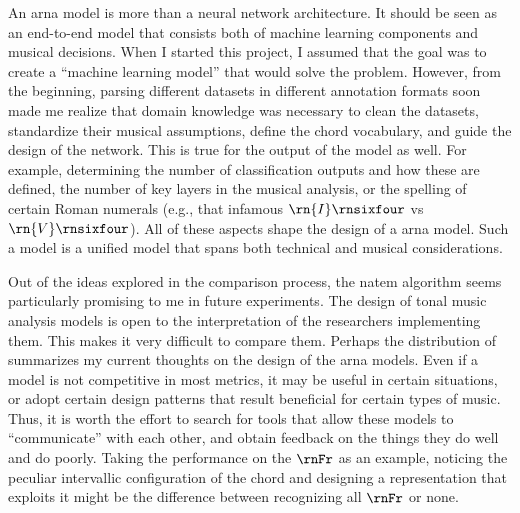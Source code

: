 
An \gls{arna} model is more than a neural network
architecture. It should be seen as an end-to-end model that
consists both of machine learning components and musical
decisions. When I started this project, I assumed that the
goal was to create a ``machine learning model'' that would
solve the problem. However, from the beginning, parsing
different datasets in different annotation formats soon made
me realize that domain knowledge was necessary to clean the
datasets, standardize their musical assumptions, define the
chord vocabulary, and guide the design of the network. This
is true for the output of the model as well. For example,
determining the number of classification outputs and how
these are defined, the number of key layers in the musical
analysis, or the spelling of certain Roman numerals (e.g.,
that infamous $\rn{I}\rnsixfour$ vs $\rn{V}\rnsixfour$). All
of these aspects shape the design of a \gls{arna} model.
Such a model is a unified model that spans both technical
and musical considerations.

Out of the ideas explored in the comparison process, the
\gls{natem} algorithm seems particularly promising to me in
future experiments. The design of tonal music analysis
models is open to the interpretation of the researchers
implementing them. This makes it very difficult to compare
them. Perhaps the distribution of 
summarizes my current thoughts on the design of the
\gls{arna} models. Even if a model is not competitive in
most metrics, it may be useful in certain situations, or
adopt certain design patterns that result beneficial for
certain types of music. Thus, it is worth the effort to
search for tools that allow these models to ``communicate''
with each other, and obtain feedback on the things they do
well and do poorly. Taking the performance on the $\rnFr$ as
an example, noticing the peculiar intervallic configuration
of the chord and designing a representation that exploits it
might be the difference between recognizing all $\rnFr$ or
none.


